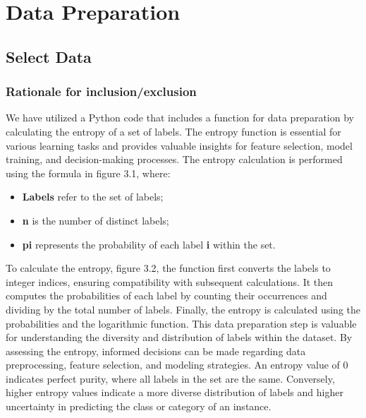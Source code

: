 \chapter{Data Preparation}

\section{Select Data}

\subsection{Rationale for inclusion/exclusion}

We have utilized a Python code that includes a function for data preparation by calculating the entropy of a set of labels. The entropy function is essential for various learning tasks and provides valuable insights for feature selection, model training, and decision-making processes.
The entropy calculation is performed using the formula in figure 3.1, where:
\begin{itemize}
    \item \textbf{Labels} refer to the set of labels;
    \item \textbf{n} is the number of distinct labels;
    \item \textbf{pi} represents the probability of each label \textbf{i} within the set.
\end{itemize}
To calculate the entropy, figure 3.2, the function first converts the labels to integer indices, ensuring compatibility with subsequent calculations. It then computes the probabilities of each label by counting their occurrences and dividing by the total number of labels. Finally, the entropy is calculated using the probabilities and the logarithmic function.
This data preparation step is valuable for understanding the diversity and distribution of labels within the dataset. By assessing the entropy, informed decisions can be made regarding data preprocessing, feature selection, and modeling strategies. An entropy value of 0 indicates perfect purity, where all labels in the set are the same. Conversely, higher entropy values indicate a more diverse distribution of labels and higher uncertainty in predicting the class or category of an instance.

